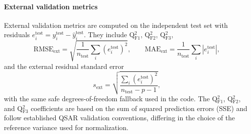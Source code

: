 \documentclass[11pt,a4paper]{article}
\begin{document}
\paragraph{External validation metrics}
External validation metrics are computed on the independent test set with residuals $e_i^{\mathrm{test}} = y_i^{\mathrm{test}} - \hat{y}_i^{\mathrm{test}}$. They include Q$^2_{\mathrm{F1}}$, Q$^2_{\mathrm{F2}}$, Q$^2_{\mathrm{F3}}$,
\[
\mathrm{RMSE}_{\mathrm{ext}} = \sqrt{\frac{1}{n_{\mathrm{test}}}\sum_i (e_i^{\mathrm{test}})^2},\qquad
\mathrm{MAE}_{\mathrm{ext}} = \frac{1}{n_{\mathrm{test}}}\sum_i |e_i^{\mathrm{test}}|,
\]
and the external residual standard error
\[
 s_{\mathrm{ext}} = \sqrt{\frac{\sum_i (e_i^{\mathrm{test}})^2}{n_{\mathrm{test}} - p - 1}},
\]
with the same safe degrees-of-freedom fallback used in the code. The Q$^2_{\mathrm{F1}}$, Q$^2_{\mathrm{F2}}$, and Q$^2_{\mathrm{F3}}$ coefficients are based on the sum of squared prediction errors (SSE) and follow established QSAR validation conventions, differing in the choice of the reference variance used for normalization.
\end{document}
